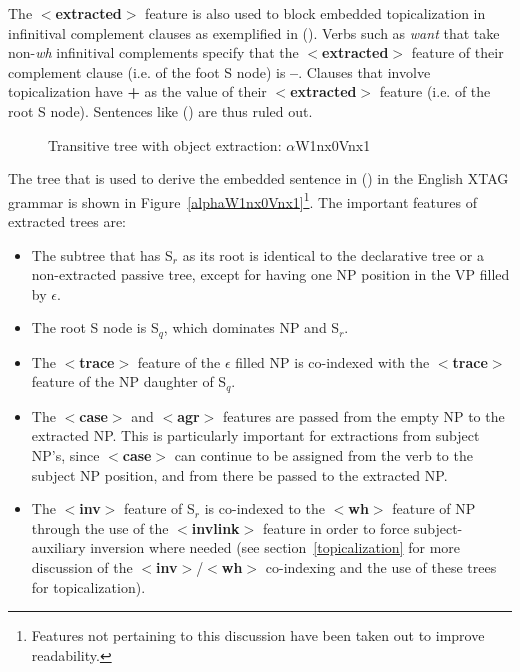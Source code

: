 The {\bf $<$extracted$>$} feature is also used to block embedded topicalization
in infinitival complement clauses as exemplified in (). 
Verbs such as {\em want} that take non-{\em wh} infinitival complements
specify that the {\bf $<$extracted$>$} feature of their complement clause
(i.e. of the foot S node)
is {\bf --}. Clauses that involve topicalization have {\bf +} as the value
of their {\bf $<$extracted$>$} feature (i.e. of the root S node). 
Sentences like () are thus ruled out.  

\begin{figure}[htb]
\centering
\mbox{}
\caption{Transitive tree with object extraction: $\alpha$W1nx0Vnx1}
\label{alphaW1nx0Vnx1}
\label{2;5,1}
\end{figure} 


The tree that is used to derive the embedded sentence in () in
the English XTAG grammar is shown in
Figure~\ref{alphaW1nx0Vnx1}\footnote{Features not pertaining to this
  discussion have been taken out to improve readability.}.  The
important features of extracted trees are:

\begin{itemize}
\item The subtree that has S$_{r}$ as its root is identical to the
  declarative tree or a non-extracted passive tree, except for having
  one NP position in the VP filled by $\epsilon$.

\item The root S node is S$_{q}$, which dominates NP and S$_{r}$.
  
\item The {\bf $<$trace$>$} feature of the $\epsilon$ filled NP is
  co-indexed with the {\bf $<$trace$>$} feature of the NP daughter of
  S$_{q}$.

\item The {\bf $<$case$>$} and {\bf $<$agr$>$} features are passed
  from the empty NP to the extracted NP.  This is particularly
  important for extractions from subject NP's, since {\bf $<$case$>$}
  can continue to be assigned from the verb to the subject NP
  position, and from there be passed to the extracted NP.
  
\item The {\bf $<$inv$>$} feature of S$_{r}$ is co-indexed to the {\bf
    $<$wh$>$} feature of NP through the use of the {\bf $<$invlink$>$}
  feature in order to force subject-auxiliary inversion where needed
  (see section~\ref{topicalization} for more discussion of the {\bf
    $<$inv$>$}/{\bf$<$wh$>$} co-indexing and the use of these trees
  for topicalization).

\end{itemize}



